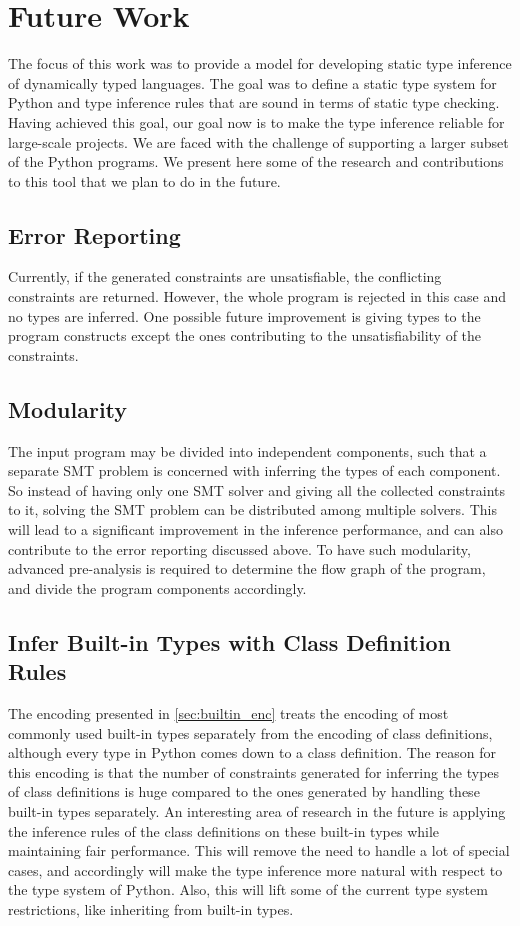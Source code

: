 \section{Future Work}
The focus of this work was to provide a model for developing static type inference of dynamically typed languages. The goal was to define a static type system for Python and type inference rules that are sound in terms of static type checking. Having achieved this goal, our goal now is to make the type inference reliable for large-scale projects. We are faced with the challenge of supporting a larger subset of the Python programs. We present here some of the research and contributions to this tool that we plan to do in the future.

\subsection{Error Reporting}
Currently, if the generated constraints are unsatisfiable, the conflicting constraints are returned. However, the whole program is rejected in this case and no types are inferred. One possible future improvement is giving types to the program constructs except the ones contributing to the unsatisfiability of the constraints.
\subsection{Modularity}
The input program may be divided into independent components, such that a separate SMT problem is concerned with inferring the types of each component. So instead of having only one SMT solver and giving all the collected constraints to it, solving the SMT problem can be distributed among multiple solvers. This will lead to a significant improvement in the inference performance, and can also contribute to the error reporting discussed above. To have such modularity, advanced pre-analysis is required to determine the flow graph of the program, and divide the program components accordingly.
\subsection{Infer Built-in Types with Class Definition Rules}
The encoding presented in \ref{sec:builtin_enc} treats the encoding of most commonly used built-in types separately from the encoding of class definitions, although every type in Python comes down to a class definition. The reason for this encoding is that the number of constraints generated for inferring the types of class definitions is huge compared to the ones generated by handling these built-in types separately. An interesting area of research in the future is applying the inference rules of the class definitions on these built-in types while maintaining fair performance. This will remove the need to handle a lot of special cases, and accordingly will make the type inference more natural with respect to the type system of Python. Also, this will lift some of the current type system restrictions, like inheriting from built-in types.